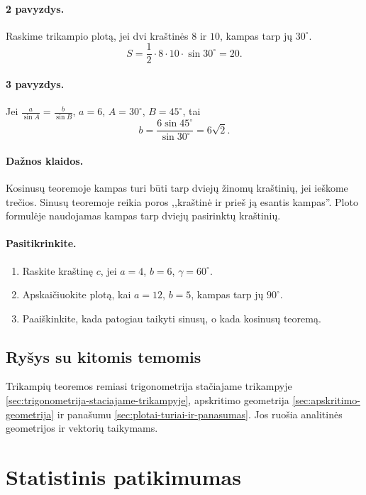 \paragraph{2 pavyzdys.}
Raskime trikampio plotą, jei dvi kraštinės $8$ ir $10$, kampas tarp jų $30^\circ$.
\[
S=\frac12\cdot8\cdot10\cdot\sin30^\circ=20.
\]

\paragraph{3 pavyzdys.}
Jei $\frac{a}{\sin A}=\frac{b}{\sin B}$, $a=6$, $A=30^\circ$, $B=45^\circ$, tai
\[
b=\frac{6\sin45^\circ}{\sin30^\circ}=6\sqrt2.
\]

\paragraph{Dažnos klaidos.}
Kosinusų teoremoje kampas turi būti tarp dviejų žinomų kraštinių, jei ieškome trečios. Sinusų teoremoje reikia poros ,,kraštinė ir prieš ją esantis kampas''. Ploto formulėje naudojamas kampas tarp dviejų pasirinktų kraštinių.

\paragraph{Pasitikrinkite.}
\begin{enumerate}
\item Raskite kraštinę $c$, jei $a=4$, $b=6$, $\gamma=60^\circ$.
\item Apskaičiuokite plotą, kai $a=12$, $b=5$, kampas tarp jų $90^\circ$.
\item Paaiškinkite, kada patogiau taikyti sinusų, o kada kosinusų teoremą.
\end{enumerate}

\subsection{Ryšys su kitomis temomis}

Trikampių teoremos remiasi trigonometrija stačiajame trikampyje \ref{sec:trigonometrija-staciajame-trikampyje}, apskritimo geometrija \ref{sec:apskritimo-geometrija} ir panašumu \ref{sec:plotai-turiai-ir-panasumas}. Jos ruošia analitinės geometrijos ir vektorių taikymams.

\section{Statistinis patikimumas}\label{sec:statistinis-patikimumas}

